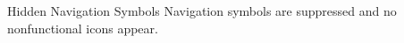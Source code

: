 \documentclass[14pt,t]{beamer-accessibility}
\begin{document}
\begin{frame}{Hidden Navigation Symbols}
Navigation symbols are suppressed and no nonfunctional icons appear.
\end{frame}
\end{document}
